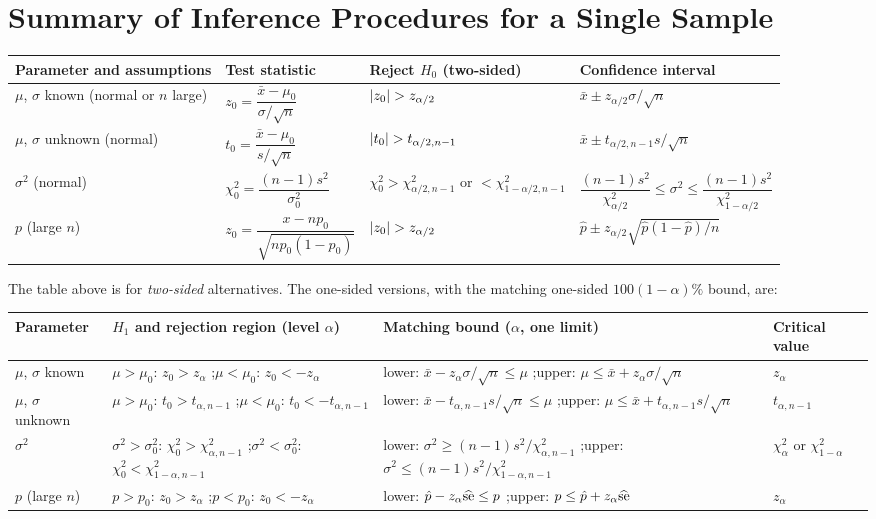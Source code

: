 \section{Summary of Inference Procedures for a Single Sample}

\begin{center}
\small
\begin{tabular}{p{2.4cm}p{3.2cm}p{3.6cm}p{3.4cm}}
\toprule
Parameter and assumptions & Test statistic & Reject $H_0$ (two-sided) & Confidence interval \\
\midrule
$\mu$, $\sigma$ known (normal or $n$ large) & $z_0=\dfrac{\bar{x}-\mu_0}{\sigma/\sqrt n}$ & $\lvert z_0\rvert>z_{\alpha/2}$ & $\bar{x}\pm z_{\alpha/2}\sigma/\sqrt n$ \\
$\mu$, $\sigma$ unknown (normal) & $t_0=\dfrac{\bar{x}-\mu_0}{s/\sqrt n}$ & $\lvert t_0\rvert>t_{\alpha/2,n-1}$ & $\bar{x}\pm t_{\alpha/2,n-1}s/\sqrt n$ \\
$\sigma^2$ (normal) & $\chi_0^2=\dfrac{(n-1)s^2}{\sigma_0^2}$ & $\chi_0^2>\chi^2_{\alpha/2,n-1}$ or $<\chi^2_{1-\alpha/2,n-1}$ & $\dfrac{(n-1)s^2}{\chi^2_{\alpha/2}}\le\sigma^2\le\dfrac{(n-1)s^2}{\chi^2_{1-\alpha/2}}$ \\
$p$ (large $n$) & $z_0=\dfrac{x-np_0}{\sqrt{np_0(1-p_0)}}$ & $\lvert z_0\rvert>z_{\alpha/2}$ & $\hat{p}\pm z_{\alpha/2}\sqrt{\hat{p}(1-\hat{p})/n}$ \\
\bottomrule
\end{tabular}
\end{center}

The table above is for \emph{two-sided} alternatives. The one-sided versions, with the matching one-sided $100(1-\alpha)\%$ bound, are:

\begin{center}
\small
\begin{tabular}{p{2.2cm}p{3.5cm}p{3.5cm}p{3.5cm}}
\toprule
Parameter & $H_1$ and rejection region (level $\alpha$) & Matching bound ($\alpha$, one limit) & Critical value \\
\midrule
$\mu$, $\sigma$ known & $\mu>\mu_0$: $z_0>z_\alpha$ ;\quad $\mu<\mu_0$: $z_0<-z_\alpha$ & lower: $\bar{x}-z_\alpha\sigma/\sqrt n\le\mu$ ;\quad upper: $\mu\le\bar{x}+z_\alpha\sigma/\sqrt n$ & $z_\alpha$ \\
$\mu$, $\sigma$ unknown & $\mu>\mu_0$: $t_0>t_{\alpha,n-1}$ ;\quad $\mu<\mu_0$: $t_0<-t_{\alpha,n-1}$ & lower: $\bar{x}-t_{\alpha,n-1}s/\sqrt n\le\mu$ ;\quad upper: $\mu\le\bar{x}+t_{\alpha,n-1}s/\sqrt n$ & $t_{\alpha,n-1}$ \\
$\sigma^2$ & $\sigma^2>\sigma_0^2$: $\chi_0^2>\chi^2_{\alpha,n-1}$ ;\quad $\sigma^2<\sigma_0^2$: $\chi_0^2<\chi^2_{1-\alpha,n-1}$ & lower: $\sigma^2\ge(n-1)s^2/\chi^2_{\alpha,n-1}$ ;\quad upper: $\sigma^2\le(n-1)s^2/\chi^2_{1-\alpha,n-1}$ & $\chi^2_{\alpha}$ or $\chi^2_{1-\alpha}$ \\
$p$ (large $n$) & $p>p_0$: $z_0>z_\alpha$ ;\quad $p<p_0$: $z_0<-z_\alpha$ & lower: $\hat{p}-z_\alpha\widehat{\operatorname{se}}\le p$ ;\quad upper: $p\le\hat{p}+z_\alpha\widehat{\operatorname{se}}$ & $z_\alpha$ \\
\bottomrule
\end{tabular}
\end{center}

